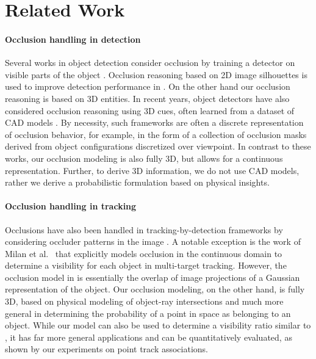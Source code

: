 \section{Related Work}
\label{sec:related}

\paragraph{Occlusion handling in detection}
Several works in object detection consider occlusion by training a detector on visible parts of the object \cite{Gao_etal_2011}. Occlusion reasoning based on 2D image silhouettes is used to improve detection performance in \cite{Hsiao_Herbert_2012}. On the other hand our occlusion reasoning is based on 3D entities. In recent years, object detectors have also considered occlusion reasoning using 3D cues, often learned from a dataset of CAD models \cite{Pepik_etal_2012,Pepik_etal_2013,Xiang_Savarese_2013}. By necessity, such frameworks are often a discrete representation of occlusion behavior, for example, in the form of a collection of occlusion masks derived from object configurations discretized over viewpoint. In contrast to these works, our occlusion modeling is also fully 3D, but allows for a continuous representation. Further, to derive 3D information, we do not use CAD models, rather we derive a probabilistic formulation based on physical insights.


\vspace{-0.3cm}
\paragraph{Occlusion handling in tracking}
Occlusions have also been handled in tracking-by-detection frameworks by considering occluder patterns in the image \cite{Kwak_etal_2012,Wu_Nevatia_2007}. A notable exception is the work of Milan et al.~\cite{Milan_etal_2014} that explicitly models occlusion in the continuous domain to determine a visibility for each object in multi-target tracking. However, the occlusion model in \cite{Milan_etal_2014} is essentially the overlap of image projections of a Gaussian representation of the object. Our occlusion modeling, on the other hand, is fully 3D, based on physical modeling of object-ray intersections and much more general in determining the probability of a point in space as belonging to an object. While our model can also be used to determine a visibility ratio similar to \cite{Milan_etal_2014}, it has far more general applications and can be quantitatively evaluated, as shown by our experiments on point track associations.


